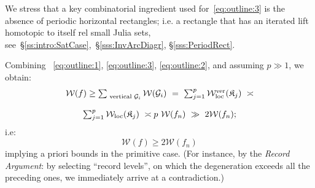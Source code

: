 \documentclass{amsart}
\newcommand{\filled}{{\mathfrak K }}
\newcommand{\1}{{\mathbb 1 }}
\newcommand{\FamG}{{\mathcal G}}
\newcommand{\Width}{{\mathcal W}}
\begin{document}
We stress that a key combinatorial ingredient used for~\eqref{eq:outline:3} is the absence of 
periodic horizontal rectangles; i.e. a rectangle that has an iterated lift homotopic to itself rel small Julia sets, see~\S\ref{ss:intro:SatCase},~\S\ref{sss:InvArcDiagr}, \S\ref{sss:PeriodRect}.


 


Combining ~\eqref{eq:outline:1}, \eqref{eq:outline:3}, \eqref{eq:outline:2},  and assuming $p\gg 1$, we obtain:
\begin{equation}
\label{eq:intro:comp}
{
\begin{array}{c}
\Width(f)\ge \sum_{\text{ vertical }\FamG_i} \Width(\FamG_i)\ = \ \sum_{j=1}^p  \Width_\loc^\ver(\filled_j)\ \asymp \\ \\  \sum_{j=1}^p  \Width_\loc(\filled_j)\ \asymp p\  \Width(f_n)\ \gg\  2 \Width(f_n);
\end{array}
}\end{equation}
i.e:
\begin{equation}
\label{eq:W f vs W f_n}
\Width(f) \ge 2 \Width(f_n)
\end{equation}
implying  a priori bounds in the primitive case.
(For instance, by the {\em Record Argument}: by selecting ``record levels'', on which the degeneration   exceeds all the preceding ones, we immediately arrive at a contradiction.)
\end{document}
